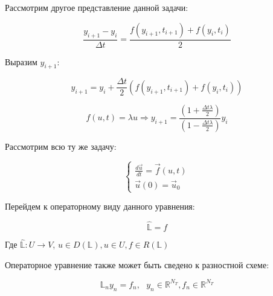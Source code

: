 \documentclass[10pt,a4paper]{article}
\begin{document}
	
	
	Рассмотрим другое представление данной задачи:
	
	\begin{equation}
		\frac{y_{i + 1} - y_{i}}{\Delta t} = \frac{f\left(y_{i + 1}, t_{i + 1}
		\right) + f\left(y_{i}, t_{i}\right)}{2}
	\end{equation}
	
	Выразим $y_{i + 1}$:
	
	\begin{equation}
		y_{i + 1} = 
		y_{i} + \frac{\Delta t}{2}\left(f\left(y_{i + 1}, t_{i + 1}\right) + 
		f\left(y_{i}, t_{i}\right)\right)
	\end{equation}
	
	\begin{equation}
		f\left(u, t\right) = \lambda u \Rightarrow y_{i + 1} = 
		\frac{\left(1 + \frac{\Delta t\lambda}{2}\right)}{\left(1 - 
		\frac{\Delta t\lambda}{2}\right)}y_{i}
	\end{equation}
	
	
	Рассмотрим всю ту же задачу:
	
	\begin{equation}
		\begin{cases}
			\frac{d\vec{u}}{dt} = \vec{f}\left(u, t\right)
			\\
			\vec{u}\left(0\right) = \vec{u}_{0}
		\end{cases}
	\end{equation}
	
	Перейдем к операторному виду данного уравнения:
	
	\begin{equation}
		\hat{\mathbb{L}} = f
	\end{equation}
	
	Где $\hat{\mathbb{L}}: U \rightarrow V$, $u \in D\left(\mathbb{L}\right), 
	u \in U, f \in R\left(\mathbb{L}\right)$
	
	Операторное уравнение также может быть сведено к разностной схеме:
	
	\begin{equation}
		\mathbb{L}_{n}y_{n} = f_{n},  \ \ \ y_{n} \in \mathbb{R}^{N_{T}}, 
		f_{n}\in \mathbb{R}^{N_{T}}
 	\end{equation}
 	
\end{document}
